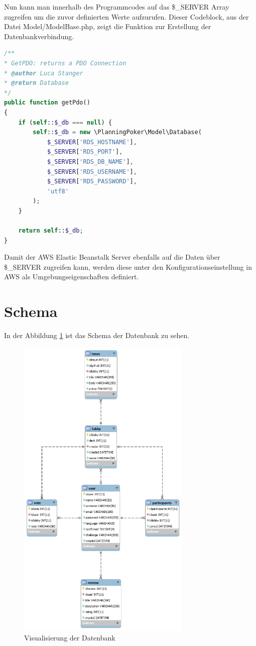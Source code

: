 Nun kann man innerhalb des Programmcodes auf das \$\_SERVER Array zugreifen um die zuvor definierten Werte aufzurufen. Dieser Codeblock, aus der Datei Model/ModelBase.php, zeigt die Funktion zur Erstellung der Datenbankverbindung. 

\begin{lstlisting}[caption={Funktion getPdo()}, language=PHP]
/**
* GetPDO: returns a PDO Connection
* @author Luca Stanger
* @return Database
*/
public function getPdo()
{
	if (self::$_db === null) {
		self::$_db = new \PlanningPoker\Model\Database(
			$_SERVER['RDS_HOSTNAME'],
			$_SERVER['RDS_PORT'],
			$_SERVER['RDS_DB_NAME'],
			$_SERVER['RDS_USERNAME'],
			$_SERVER['RDS_PASSWORD'],
			'utf8'
		);
	}

	return self::$_db;
}
\end{lstlisting}

Damit der AWS Elastic Beanstalk Server ebenfalls auf die Daten über \$\_SERVER zugreifen kann, werden diese unter den Konfigurationseinstellung in AWS als Umgebungseigenschaften definiert.

\section{Schema}
In der Abbildung \ref{datenbank} ist das Schema der Datenbank zu sehen.

\begin{figure}[H]
	\centering
  \includegraphics[width=0.74\textwidth]{images/database.png}
	\caption{Visualisierung der Datenbank}
	\label{datenbank}
\end{figure}

